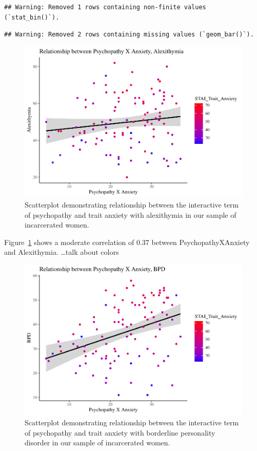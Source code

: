 \documentclass[
  man,floatsintext]{apa7}
\begin{document}
\begin{verbatim}
## Warning: Removed 1 rows containing non-finite values (`stat_bin()`).
\end{verbatim}

\begin{verbatim}
## Warning: Removed 2 rows containing missing values (`geom_bar()`).
\end{verbatim}



\begin{figure}
\includegraphics[width=1\linewidth]{d2m-Psychopathy_files/figure-latex/c-path-scatterplot-1} \caption{Scatterplot demonstrating relationship between the interactive term of psychopathy and trait anxiety with alexithymia in our sample of incarcerated women.}\label{fig:c-path-scatterplot}
\end{figure}

Figure~\ref{fig:c-path-scatterplot} shows a moderate correlation of 0.37 between PsychopathyXAnxiety and Alexithymia. \ldots talk about colors



\begin{figure}
\includegraphics[width=1\linewidth]{d2m-Psychopathy_files/figure-latex/a-path-scatterplot-1} \caption{Scatterplot demonstrating relationship between the interactive term of psychopathy and trait anxiety with borderline personality disorder in our sample of incarcerated women.}\label{fig:a-path-scatterplot}
\end{figure}
\end{document}
